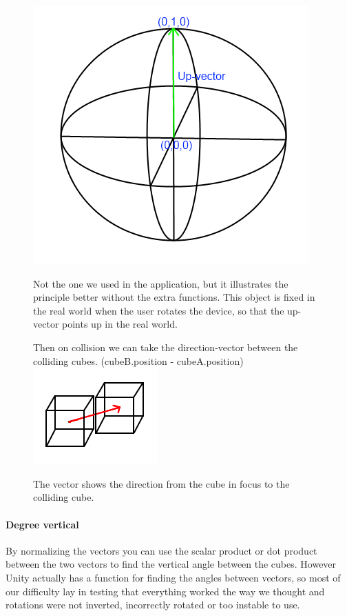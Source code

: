 \begin{figure}[ht] 
        \capstart
        \centering  
        \includegraphics{images/GyroObjectModel.png}    
        \caption[Model of the game-object used to get the direction up]{Not the one we used in the application, but it illustrates the principle better without the extra functions. This object is fixed in the real world when the user rotates the device, so that the up-vector points up in the real world.} 
        \label{fig:Gyro_model} 
 Then on collision we can take the direction-vector between the colliding cubes. (cubeB.position - cubeA.position)
        \capstart
        \centering  
        \includegraphics{images/CollisionDirectionObject.png}    
        \caption[Model of the collision direction vector]{The vector shows the direction from the cube in focus to the colliding cube.} 
        \label{fig:Collision_Direction_model} 
\end{figure}
\paragraph{Degree vertical}
By normalizing the vectors you can use the scalar product or dot product between the two vectors to find the vertical angle between the cubes. However Unity actually has a function for finding the angles between vectors, so most of our difficulty lay in testing that everything worked the way we thought and rotations were not inverted, incorrectly rotated or too instable to use.

